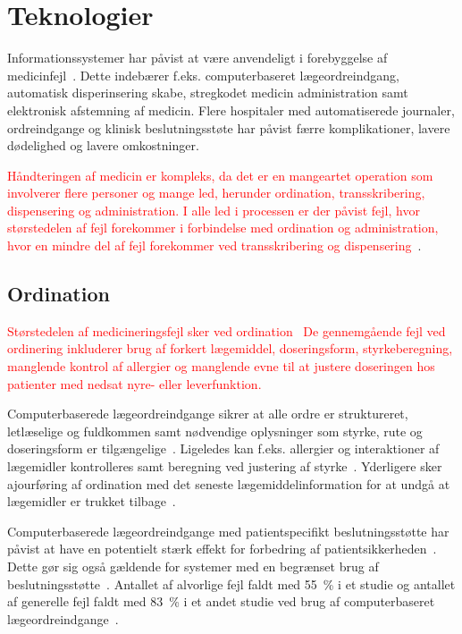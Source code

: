\chapter{Teknologier}
Informationssystemer har påvist at være anvendeligt i forebyggelse af medicinfejl~\citep{Agrawal2009, Anderson2002}. Dette indebærer f.eks. computerbaseret lægeordreindgang, automatisk disperinsering skabe, stregkodet medicin administration samt elektronisk afstemning af medicin. Flere hospitaler med automatiserede journaler, ordreindgange og klinisk beslutningsstøte har påvist færre komplikationer, lavere dødelighed og lavere omkostninger.  

\textcolor{red}{Håndteringen af medicin er kompleks, da det er en mangeartet operation som involverer flere personer og mange led, herunder ordination, transskribering, dispensering og administration. I alle led i processen er der påvist fejl, hvor størstedelen af fejl forekommer i forbindelse med ordination og administration, hvor en mindre del af fejl forekommer ved transskribering og dispensering~\citep{Agrawal2009,Anderson2002}}.

\section{Ordination}
\textcolor{red}{Størstedelen af medicineringsfejl sker ved ordination~\citep{Agrawal2009,Anderson2002,Kaushal2002}
De gennemgående fejl ved ordinering inkluderer brug af forkert lægemiddel, doseringsform, styrkeberegning, manglende kontrol af allergier og manglende evne til at justere doseringen hos patienter med nedsat nyre- eller leverfunktion.~\citep{Agrawal2009} }

Computerbaserede lægeordreindgange sikrer at alle ordre er struktureret, letlæselige og fuldkommen samt nødvendige oplysninger som styrke, rute og doseringsform er tilgængelige~\citep{Agrawal2009,Bates2000a}. Ligeledes kan f.eks. allergier og interaktioner af lægemidler kontrolleres samt beregning ved justering af styrke~\citep{Agrawal2009}. Yderligere sker ajourføring af ordination med det seneste lægemiddelinformation for at undgå at lægemidler er trukket tilbage~\citep{Agrawal2009}.

Computerbaserede lægeordreindgange med patientspecifikt beslutningsstøtte har påvist at have en potentielt stærk effekt for forbedring af patientsikkerheden~\citep{Agrawal2009, Bates2000a}. Dette gør sig også gældende for systemer med en begrænset brug af beslutningsstøtte~\citep{Bates2000a}. Antallet af alvorlige fejl faldt med 55~\% i et studie og antallet af generelle fejl faldt med 83~\% i et andet studie ved brug af computerbaseret lægeordreindgange~\citep{Bates2000a}. 

